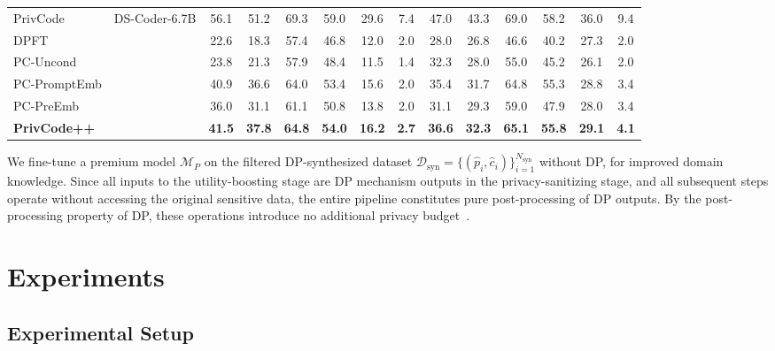 \documentclass{article}
\theoremstyle{plain}
\theoremstyle{definition}
\theoremstyle{remark}
\def \toolname{PrivCode++}
\begin{document}
\begin{table}[!t]
{\begin{tabular}{l|l|cc|cc|cc|cc|cc|cc}
PrivCode
& \multirow{6}{*}{DS-Coder-6.7B}
& 56.1 & 51.2 & 69.3 & 59.0 & 29.6 & 7.4
& 47.0 & 43.3 & 69.0 & 58.2 & 36.0 & 9.4 \\
\cline{3-14}
DPFT & & 22.6& 18.3& 57.4& 46.8& 12.0& 2.0& 28.0& 26.8& 46.6& 40.2& 27.3& 2.0\\
PC-Uncond
& & 23.8& 21.3& 57.9& 48.4
& 11.5& 1.4& 32.3& 28.0 & 55.0 & 45.2
& 26.1& 2.0\\
PC-PromptEmb& & 40.9&36.6&64.0&53.4&15.6&2.0&35.4&31.7&64.8&55.3&28.8&3.4 \\
PC-PreEmb& & 36.0 & 31.1 & 61.1 & 50.8 & 13.8 & 2.0 & 31.1 & 29.3 & 59.0 & 47.9 & 28.0& 3.4\\
\cellcolor{gray0}\textbf{\toolname}
& 
& \cellcolor{gray0}\textbf{41.5}& \cellcolor{gray0}\textbf{37.8}& \cellcolor{gray0}\textbf{64.8}& \cellcolor{gray0}\textbf{54.0}
&  \cellcolor{gray0}\textbf{16.2}& 
\cellcolor{gray0}\textbf{2.7}& \cellcolor{gray0}\textbf{36.6}& \cellcolor{gray0}\textbf{32.3}& \cellcolor{gray0}\textbf{65.1}& \cellcolor{gray0}\textbf{55.8}
&  \cellcolor{gray0}\textbf{29.1}&  \cellcolor{gray0}\textbf{4.1}\\

\bottomrule
\end{tabular}
}
\vspace{-2mm}
\end{table}


We fine-tune a premium model $\mathcal{M}_P$ on the filtered DP-synthesized dataset $\mathcal{D}_{\text{syn}} = \{(\hat{p}_i, \hat{c}_i)\}_{i=1}^{N_{\text{syn}}}$ without DP, for improved domain knowledge. 
Since all inputs to the utility-boosting stage
are DP mechanism outputs in the privacy-sanitizing stage, and all subsequent steps operate without accessing the original sensitive data, the entire pipeline constitutes pure post-processing of DP outputs. By the post-processing property of DP, these operations introduce no additional privacy budget~\cite{dpbook}.






\section{Experiments}




\subsection{Experimental Setup}
\label{sec:setup}
\end{document}
